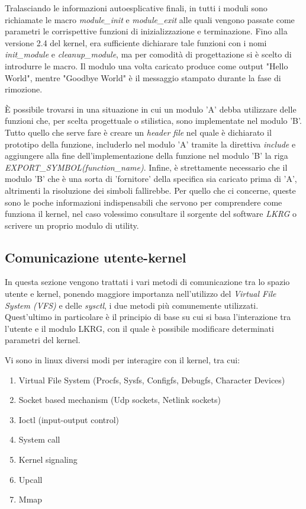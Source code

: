 Tralasciando le informazioni autoesplicative finali, in tutti i moduli sono richiamate le macro \emph{module\_init} e \emph{module\_exit} alle quali vengono passate come parametri le corrispettive funzioni di inizializzazione e terminazione. Fino alla versione 2.4 del kernel, era sufficiente dichiarare tale funzioni con i nomi \emph{init\_module} e \emph{cleanup\_module}, ma per comodità di progettazione si è scelto di introdurre le macro. Il modulo una volta caricato produce come output "Hello World", mentre "Goodbye World" è il messaggio stampato durante la fase di rimozione.

È possibile trovarsi in una situazione in cui un modulo 'A' debba utilizzare delle funzioni che, per scelta progettuale o stilistica, sono implementate nel modulo 'B'. Tutto quello che serve fare è creare un \emph{header file} nel quale è dichiarato il prototipo della funzione, includerlo nel modulo 'A' tramite la direttiva \emph{include} e aggiungere alla fine dell'implementazione della funzione nel modulo 'B' la riga \emph{EXPORT\_SYMBOL(function\_name)}. Infine, è strettamente necessario che il modulo 'B' che è una sorta di 'fornitore' della specifica sia caricato prima di 'A', altrimenti la risoluzione dei simboli fallirebbe.
Per quello che ci concerne, queste sono le poche informazioni indispensabili che servono per comprendere come funziona il kernel, nel caso volessimo consultare il sorgente del software \emph{LKRG} o scrivere un proprio modulo di utility.

\subsection{Comunicazione utente-kernel}
In questa sezione vengono trattati i vari metodi di comunicazione tra lo spazio utente e kernel, ponendo maggiore importanza nell'utilizzo del \emph{Virtual File System (VFS)} e delle \emph{sysctl}, i due metodi più comunemente utilizzati. Quest'ultimo in particolare è il principio di base su cui si basa l'interazione tra l'utente e il modulo LKRG, con il quale è possibile modificare determinati parametri del kernel.

Vi sono in linux diversi modi per interagire con il kernel, tra cui:

\begin{enumerate}
\item Virtual File System (Procfs, Sysfs, Configfs, Debugfs, Character Devices)
\item Socket based mechanism (Udp sockets, Netlink sockets)
\item Ioctl (input-output control)
\item System call
\item Kernel signaling
\item Upcall
\item Mmap
\end{enumerate}

